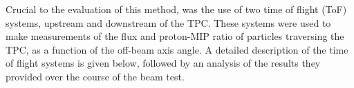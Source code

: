Crucial to the evaluation of this method, was the use of two time of flight (ToF) systems, upstream and downstream of the TPC.
These systems were used to make measurements of the flux and proton-MIP ratio of particles traversing the TPC, as a function of the off-beam axis angle.
A detailed description of the time of flight systems is given below, followed by an analysis of the results they provided over the course of the beam test.
